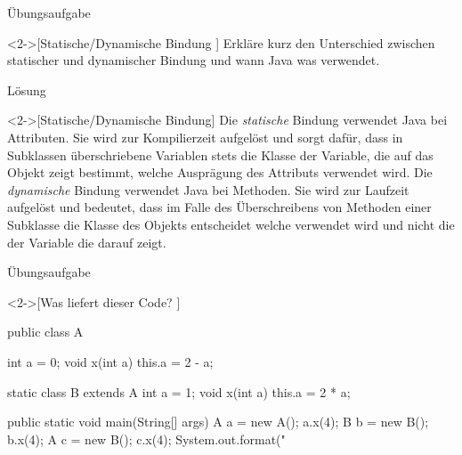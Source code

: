 \ifull
\begin{frame}[c]{Übungsaufgabe}
    \begin{exercise}<2->[Statische/Dynamische Bindung ]
        Erkläre kurz den Unterschied zwischen statischer und dynamischer Bindung und wann Java was verwendet.
    \end{exercise}
\end{frame}

\begin{frame}[c]{Lösung}
    \begin{solve}<2->[Statische/Dynamische Bindung]
        Die \emph{statische} Bindung verwendet Java bei Attributen. Sie wird zur Kompilierzeit aufgelöst und sorgt dafür, dass in Subklassen überschriebene Variablen stets die Klasse der Variable, die auf das Objekt zeigt bestimmt, welche Ausprägung des Attributs verwendet wird.\medskip\newline%
        \pause{}Die \emph{dynamische} Bindung verwendet Java bei Methoden. Sie wird zur Laufzeit aufgelöst und bedeutet, dass im Falle des Überschreibens von Methoden einer Subklasse die Klasse des Objekts entscheidet welche verwendet wird und nicht die der Variable die darauf zeigt.
    \end{solve}
\end{frame}


\begin{frame}[c,fragile]{Übungsaufgabe}
    \begin{exercise}<2->[Was liefert dieser Code? ]
\begin{plainjava}[morekeywords={[3]{A,B}},aboveskip=0pt,belowskip=0pt]
public class A {
    int a = 0;
    void x(int a) { this.a = 2 - a; }

    static class B extends A {
        int a = 1;
        void x(int a) { this.a = 2 * a; }
    }

    public static void main(String[] args) {
        A a = new A(); a.x(4);
        B b = new B(); b.x(4);
        A c = new B(); c.x(4);
        System.out.format("%
    }
}
\end{plainjava}
    \end{exercise}
\end{frame}


